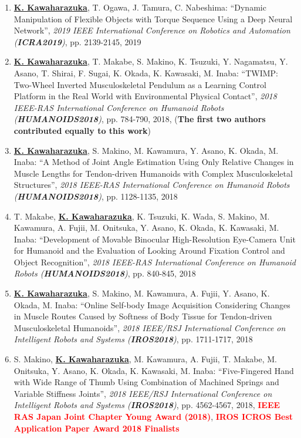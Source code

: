 \documentclass[letterpaper]{article}
\begin{document}
\begin{enumerate}
\item \underline{\textbf{K. Kawaharazuka}}, T. Ogawa, J. Tamura, C. Nabeshima: ``Dynamic Manipulation of Flexible Objects with Torque Sequence Using a Deep Neural Network'', \textit{2019 IEEE International Conference on Robotics and Automation (\textit{\textbf{ICRA2019}})}, pp. 2139-2145, 2019
\item \underline{\textbf{K. Kawaharazuka}}, T. Makabe, S. Makino, K. Tsuzuki, Y. Nagamatsu, Y. Asano, T. Shirai, F. Sugai, K. Okada, K. Kawasaki, M. Inaba: ``TWIMP: Two-Wheel Inverted Musculoskeletal Pendulum as a Learning Control Platform in the Real World with Environmental Physical Contact'', \textit{2018 IEEE-RAS International Conference on Humanoid Robots (\textit{\textbf{HUMANOIDS2018}})}, pp. 784-790, 2018, (\textbf{The first two authors contributed equally to this work})
\item \underline{\textbf{K. Kawaharazuka}}, S. Makino, M. Kawamura, Y. Asano, K. Okada, M. Inaba: ``A Method of Joint Angle Estimation Using Only Relative Changes in Muscle Lengths for Tendon-driven Humanoids with Complex Musculoskeletal Structures'', \textit{2018 IEEE-RAS International Conference on Humanoid Robots (\textit{\textbf{HUMANOIDS2018}})}, pp. 1128-1135, 2018
\item T. Makabe, \underline{\textbf{K. Kawaharazuka}}, K. Tsuzuki, K. Wada, S. Makino, M. Kawamura, A. Fujii, M. Onitsuka, Y. Asano, K. Okada, K. Kawasaki, M. Inaba: ``Development of Movable Binocular High-Resolution Eye-Camera Unit for Humanoid and the Evaluation of Looking Around Fixation Control and Object Recognition'', \textit{2018 IEEE-RAS International Conference on Humanoid Robots (\textit{\textbf{HUMANOIDS2018}})}, pp. 840-845, 2018
\item \underline{\textbf{K. Kawaharazuka}}, S. Makino, M. Kawamura, A. Fujii, Y. Asano, K. Okada, M. Inaba: ``Online Self-body Image Acquisition Considering Changes in Muscle Routes Caused by Softness of Body Tissue for Tendon-driven Musculoskeletal Humanoids'', \textit{2018 IEEE/RSJ International Conference on Intelligent Robots and Systems (\textit{\textbf{IROS2018}})}, pp. 1711-1717, 2018
\item S. Makino, \underline{\textbf{K. Kawaharazuka}}, M. Kawamura, A. Fujii, T. Makabe, M. Onitsuka, Y. Asano, K. Okada, K. Kawasaki, M. Inaba: ``Five-Fingered Hand with Wide Range of Thumb Using Combination of Machined Springs and Variable Stiffness Joints'', \textit{2018 IEEE/RSJ International Conference on Intelligent Robots and Systems (\textit{\textbf{IROS2018}})}, pp. 4562-4567, 2018, \textbf{\textcolor{red}{IEEE RAS Japan Joint Chapter Young Award (2018)}}, \textbf{\textcolor{red}{IROS ICROS Best Application Paper Award 2018 Finalists}}

\end{enumerate}
\end{document}
